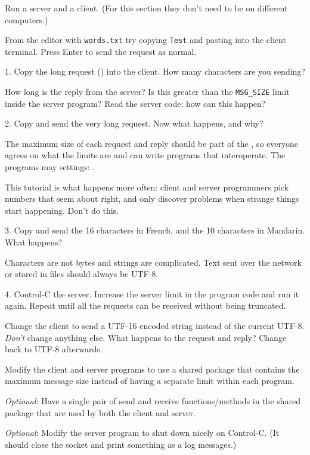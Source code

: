 Run a server and a client. (For this section they don't need to be on different
computers.)

From the editor with \texttt{words.txt} try copying \texttt{Test} and pasting into
the client terminal. Press Enter to send the request as normal.

1. Copy the long request () into the client. How many characters
are you sending?

How long is the reply from the server? Is this greater than the \texttt{MSG\_SIZE}
limit inside the server program? Read the server code: how can this happen?

2. Copy and send the very long request. Now what happens, and why?

\begin{IMPORTANT}
The maximum size of each request and reply should be part of the , so everyone agrees on what the limits are and can write programs that
interoperate. The programs may  settings:  .

This tutorial is what happens more often: client and server programmers pick
numbers that seem about right, and only discover problems when strange things start
happening. Don't do this.
\end{IMPORTANT}

3. Copy and send the 16 characters in French, and the 10 characters in Mandarin.
What happens?

\begin{IMPORTANT}
Characters are not bytes and strings are complicated. Text sent over the network
or stored in files should always be UTF-8.
\end{IMPORTANT}

4. Control-C the server. Increase the server limit in the program code and run it
again. Repeat until all the requests can be received without being truncated.



Change the client  to send a UTF-16 encoded string instead of the
current UTF-8. \emph{Don't} change anything else. What happens to the request and
reply? Change back to UTF-8 afterwards.

Modify the client and server programs to use a shared package that contains the
maximum message size instead of having a separate limit within each program.

\emph{Optional}: Have a single pair of send and receive functions/methods
in the shared package that are used by both the client and server.

\emph{Optional}: Modify the server program to shut down nicely on Control-C.
(It should close the socket and print something as a log messages.)


\COPYRIGHT


